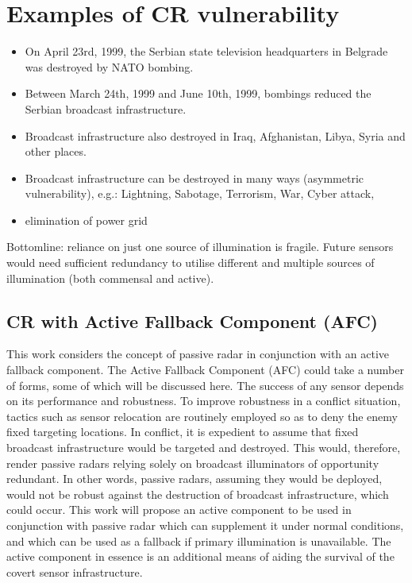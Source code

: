 \section{Examples of CR vulnerability}

\begin{itemize}
\item On April 23rd, 1999, the Serbian state television headquarters in Belgrade was destroyed by NATO bombing. 

\item Between March 24th, 1999 and June 10th, 1999, bombings reduced the Serbian broadcast infrastructure. 

\item Broadcast infrastructure also destroyed in Iraq, Afghanistan, Libya, Syria and other places. 

\item Broadcast infrastructure can be destroyed in many ways (asymmetric vulnerability), e.g.: Lightning, Sabotage, Terrorism, War, Cyber attack,
\item elimination of power grid 

\end{itemize}

Bottomline: reliance on just one source of illumination is fragile. Future sensors would need sufficient redundancy to utilise different and multiple sources of illumination (both commensal and active).


\subsection{CR with Active Fallback Component (AFC)}

This work \cite{doh} considers the concept of passive radar in conjunction with an active fallback component. The Active Fallback Component (AFC) could take a number of forms, some of which will be discussed here. The success of any sensor depends on its performance and robustness. To improve robustness in a conflict situation, tactics such as sensor relocation are routinely employed so as to deny the enemy fixed targeting locations. In conflict, it is expedient to assume that fixed broadcast infrastructure would be targeted and destroyed. This would, therefore, render passive radars relying solely on broadcast illuminators of opportunity redundant. In other words, passive radars, assuming they would be deployed, would not be robust against the destruction of broadcast infrastructure, which could occur. This work will propose an active component to be used in conjunction with passive radar which can supplement it under normal conditions, and which can be used as a fallback if primary illumination is unavailable. The active component in essence is an additional means of aiding the survival of the covert sensor infrastructure.

